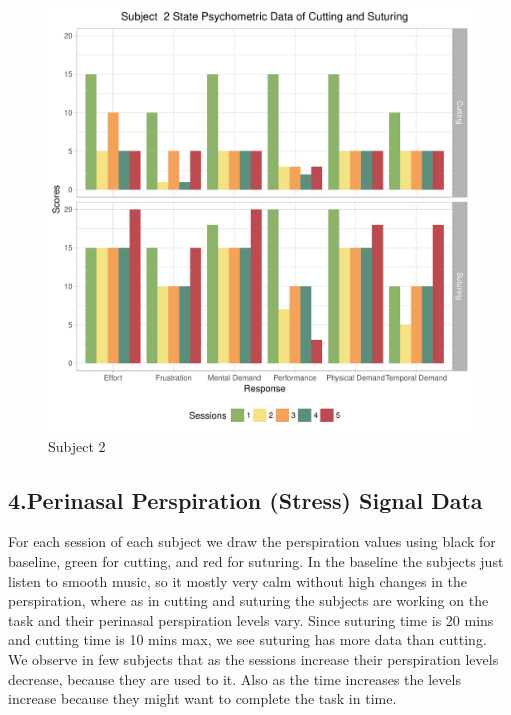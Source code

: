 \documentclass[12pt,epsf]{report}
\begin{document}
{\begin{figure}[!htb]
\begin{minipage}[c]{0.5\linewidth}
	\includegraphics[width=\linewidth]{subject02_State_Psychometric_Data_of_Cutting_and_Suturing.pdf}
	\caption{Subject 2}
	\end{minipage}
\end{figure}
\FloatBarrier
\subsection*{4.Perinasal Perspiration (Stress) Signal Data}
For each session of each subject  we draw the perspiration values using black for baseline, green for cutting, and red for suturing. In the baseline the subjects just listen to smooth music, so it mostly very calm without high changes in the perspiration, where as in cutting and suturing the subjects are working on the task and their perinasal perspiration levels vary. 
Since suturing time is 20 mins and cutting time is 10 mins max, we see suturing has more data than cutting.\\
We observe in few subjects that as the sessions increase their perspiration levels decrease, because they are used to it. Also as the time increases the levels increase because they might want to complete the task in time.

}
\end{document}

